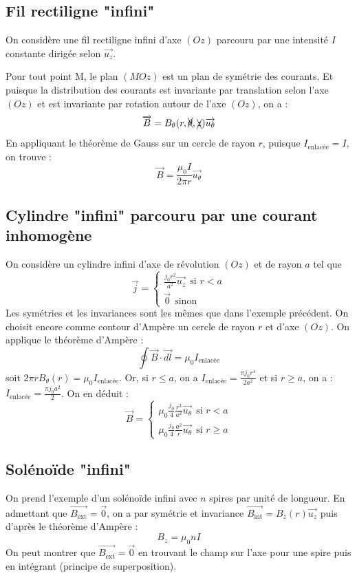 \documentclass[french]{book}
\theoremstyle{plain}
\theoremstyle{definition}
\theoremstyle{remark}
\begin{document}
\subsection{Fil rectiligne "infini"}
On considère une fil rectiligne infini d'axe $(Oz)$ parcouru par une intensité $I$ constante dirigée selon $\overrightarrow{u_z}$. \\ \par Pour tout point M, le plan $(MOz)$ est un plan de symétrie des courants. Et puisque la distribution des courants est invariante par translation selon l'axe $(Oz)$ et est invariante par rotation autour de l'axe $(Oz)$, on a : $$\overrightarrow{B}=B_\theta(r,\xcancel{\theta},\xcancel{z})\overrightarrow{u_\theta}$$ En appliquant le théorème de Gauss sur un cercle de rayon $r$, puisque $I_\text{enlacée}=I$, on trouve : $$\overrightarrow{B}=\frac{\mu_0 I}{2\pi r}\overrightarrow{u_\theta}$$
\subsection{Cylindre "infini" parcouru par une courant inhomogène}
On considère un cylindre infini d'axe de révolution $(Oz)$ et de rayon $a$ tel que $$\overrightarrow{j}=\begin{cases}
	\displaystyle\frac{j_0 r^2}{a^2}\overrightarrow{u_z} \ \ \text{si }r<a \\[3mm]
	\overrightarrow{0} \ \ \text{sinon}
\end{cases}$$ Les symétries et les invariances sont les mêmes que dans l'exemple précédent. On choisit encore comme contour d'Ampère un cercle de rayon $r$ et d'axe $(Oz)$. On applique le théorème d'Ampère : $$\oint\overrightarrow{B}\cdot\overrightarrow{dl}=\mu_0I_\text{enlacée}$$ soit $2\pi rB_\theta(r)=\mu_0I_\text{enlacée}$. Or, si $r\leqslant a$, on a $\displaystyle I_\text{enlacée}=\frac{\pi j_0r^4}{2a^2}$ et si $r\geqslant a$, on a : $I_\text{enlacée}=\frac{\pi j_0 a^2}{2}$. On en déduit : $$\overrightarrow{B}=\begin{cases}
	\displaystyle \mu_0\frac{j_0}{4}\frac{r^3}{a^2}\overrightarrow{u_\theta} \ \ \text{si }r<a \\[3mm]
	\displaystyle \mu_0\frac{j_0}{4}\frac{a^2}{r}\overrightarrow{u_\theta} \ \ \text{si }r\geqslant a
\end{cases}$$
\subsection{Solénoïde "infini"}
On prend l'exemple d'un solénoïde infini avec $n$ spires par unité de longueur. En admettant que $\overrightarrow{B_\text{ext}}=\overrightarrow{0}$, on a par symétrie et invariance $\overrightarrow{B_\text{int}}=B_z(r)\overrightarrow{u_z}$ puis d’après le théorème d’Ampère : $$B_z=\mu_0nI$$
On peut montrer que $\overrightarrow{B_\text{ext}}=\overrightarrow{0}$ en trouvant le champ sur l’axe pour une spire puis en intégrant (principe de superposition).
\end{document}

